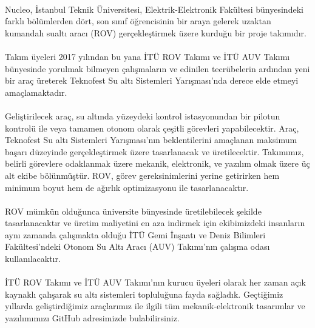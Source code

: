 \documentclass[12pt]{article}
\begin{document}
\begin{justify}
\paragraph{} Nucleo, İstanbul Teknik Üniversitesi, Elektrik-Elektronik Fakültesi bünyesindeki farklı bölümlerden dört, son sınıf öğrencisinin bir araya gelerek uzaktan kumandalı sualtı aracı (ROV) gerçekleştirmek üzere kurduğu bir proje takımıdır.
\end{justify}
\begin{justify}
\paragraph{} Takım üyeleri 2017 yılından bu yana İTÜ ROV Takımı ve İTÜ AUV Takımı bünyesinde yorulmak bilmeyen çalışmaların ve edinilen tecrübelerin ardından  yeni bir araç üreterek Teknofest Su altı Sistemleri Yarışması'nda derece elde etmeyi amaçlamaktadır.
\end{justify}
\begin{justify}
\paragraph{} Geliştirilecek araç, su altında yüzeydeki kontrol istasyonundan bir pilotun kontrolü ile veya tamamen otonom olarak çeşitli görevleri yapabilecektir. Araç, Teknofest Su altı Sistemleri Yarışması’nın beklentilerini amaçlanan maksimum başarı düzeyinde gerçekleştirmek üzere tasarlanacak ve üretilecektir. Takımımız, belirli görevlere odaklanmak üzere mekanik, elektronik, ve yazılım olmak üzere üç alt ekibe bölünmüştür. ROV, görev gereksinimlerini yerine getirirken hem minimum boyut hem de ağırlık optimizasyonu ile tasarlanacaktır.
\end{justify}
\begin{justify}
\paragraph{} ROV mümkün olduğunca üniversite bünyesinde üretilebilecek şekilde tasarlanacaktır ve üretim maliyetini en aza indirmek için ekibimizdeki insanların aynı zamanda çalışmakta olduğu İTÜ Gemi İnşaatı ve Deniz Bilimleri Fakültesi'ndeki Otonom Su Altı Aracı (AUV) Takımı'nın çalışma odası kullanılacaktır.
\end{justify}
\begin{justify}
\paragraph{} İTÜ ROV Takımı ve İTÜ AUV Takımı'nın kurucu üyeleri olarak her zaman açık kaynaklı çalışarak su altı sistemleri topluluğuna fayda sağladık. Geçtiğimiz yıllarda geliştirdiğimiz araçlarımız ile ilgili tüm mekanik-elektronik tasarımlar ve yazılımımızı GitHub adresimizde bulabilirsiniz.
\end{justify}
\end{document}
